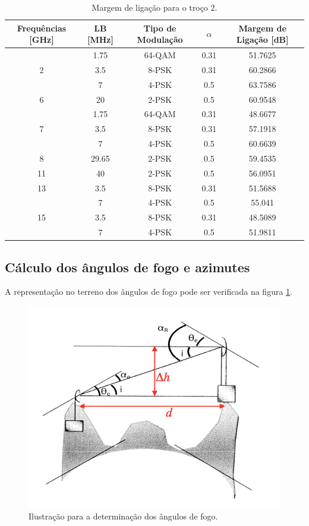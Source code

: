 \begin{table}[H]
\centering
\begin{tabular}{|c|c|c|c|c|}
\hline
Frequências [GHz] & LB [MHz] & Tipo de Modulação & $\alpha$ & Margem de Ligação [dB] \\
\hline
 & 1.75 & 64-QAM & 0.31 & 51.7625\\
2 & 3.5 & 8-PSK & 0.31 & 60.2866\\
 & 7 & 4-PSK & 0.5 & 63.7586\\
\hline
 6 & 20 & 2-PSK & 0.5 & 60.9548\\
\hline
 & 1.75 & 64-QAM & 0.31 & 48.6677\\
7 & 3.5 & 8-PSK & 0.31 & 57.1918\\
 &7 & 4-PSK & 0.5 & 60.6639\\
\hline
8 & 29.65 & 2-PSK & 0.5 & 59.4535\\
\hline
11 & 40 & 2-PSK & 0.5 & 56.0951\\
\hline
13 & 3.5 & 8-PSK & 0.31 & 51.5688\\
& 7 & 4-PSK & 0.5 & 55.041 \\
\hline
15 & 3.5 & 8-PSK & 0.31 & 48.5089\\
 & 7 & 4-PSK & 0.5 & 51.9811\\
\hline
\end{tabular}
\caption{Margem de ligação para o troço 2.}
\label{reflexoes2}

\end{table}

\subsection{Cálculo dos ângulos de fogo e azimutes}
A representação no terreno dos ângulos de fogo pode ser verificada na figura \ref{fogo}.

\begin{figure}[H]
\centering
\includegraphics[scale=0.8]{angulosfogo.png}
\caption{Ilustração para a determinação dos ângulos de fogo.}
\label{fogo}
\end{figure}

